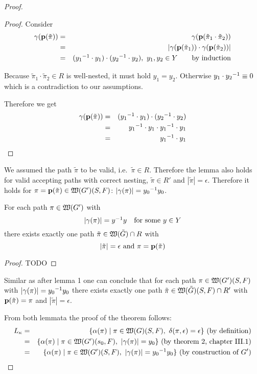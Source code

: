 \begin{proof}
\begin{proof}
Consider 
\begin{eqnarray*}
\gamma(\mathbf{p}({\tilde{\pi}})) &=& \gamma(\mathbf{p}({\tilde{\pi}_1 \cdot \tilde{\pi}_2}))
\\
&=& |\gamma(\mathbf{p}({\tilde{\pi}_1})) \cdot \gamma(\mathbf{p}({\tilde{\pi}_2}))| \\
&=& (\mbox{${y_1}^{-1}$} \cdot y_1) \cdot (\mbox{${y_2}^{-1}$} \cdot y_2),\ y_1, y_2 \in
Y\qquad\text{by induction}
\end{eqnarray*}

Because $\tilde{\pi}_1 \cdot \tilde{\pi}_2 \in R$ is well-nested, it must hold
$y_1 = y_2$. Otherwise $y_1 \cdot \mbox{${y_2}^{-1}$} \equiv 0$ which is a contradiction
to our assumptions.

Therefore we get
\begin{eqnarray*}
\gamma(\mathbf{p}({\tilde{\pi}})) &=& (\mbox{${y_1}^{-1}$} \cdot y_1) \cdot (\mbox{${y_2}^{-1}$} \cdot
y_2)\\
&=& \mbox{${y_1}^{-1}$} \cdot y_1 \cdot \mbox{${y_1}^{-1}$} \cdot y_1 \\
&=& \mbox{${y_1}^{-1}$} \cdot y_1
\end{eqnarray*}
\end{proof}

We assumed the path $\tilde{\pi}$ to be valid, i.e.\ $\tilde{\pi} \in R$.
Therefore the lemma also holds for valid accepting paths with correct nesting,
$\tilde{\pi} \in R'$ and $|\tilde{\pi}| = \epsilon$. Therefore it holds for
$\pi = \mathbf{p}({\tilde{\pi}}) \in \mbox{$\mathfrak{W}({G'})$}(S, F)$: $|\gamma(\pi)| = \mbox{${y_0}^{-1}$}
y_0$.

\bigskip
\begin{lemma}
For each path $\pi \in \mbox{$\mathfrak{W}({G'})$}$ with
\[ |\gamma(\pi)| = \mbox{${y}^{-1}$} y \quad\text{for some }y \in Y \]
there exists exactly one path $\tilde{\pi} \in \mbox{$\mathfrak{W}({\tilde{G}})$} \cap R$ with
\[ |\tilde{\pi}| = \epsilon\text{ and }\pi = \mathbf{p}({\tilde{\pi}}) \] 
\end{lemma}

\begin{proof}
TODO
\end{proof}

Similar as after lemma 1 one can conclude that for each path $\pi \in
\mbox{$\mathfrak{W}({G'})$}(S, F)$ with $|\gamma(\pi)| = \mbox{${y_0}^{-1}$}y_0$ there exists exactly one
path $\tilde{\pi} \in \mbox{$\mathfrak{W}({\tilde{G}})$}(S, F) \cap R'$ with
$\mathbf{p}({\tilde{\pi}}) = \pi$ and $|\tilde{\pi}| = \epsilon$.

From both lemmata the proof of the theorem follows:
\begin{eqnarray*}
L_\kappa &=& \setof{\alpha(\pi) \mid \pi \in \pathcat{G}(S, F),\ \delta(\pi,
\epsilon) = \epsilon}\text{ (by definition)} \\
&=& \setof{\alpha(\pi) \mid \pi \in \pathcat{G'}(s_0, F),\ |\gamma(\pi)| =
y_0}\text{ (by theorem 2, chapter III.1)} \\
&=& \setof{\alpha(\pi) \mid \pi \in \pathcat{G'}(S, F),\
|\gamma(\pi)| = \inv{y_0} y_0}\text{ (by construction of $G'$)}
\end{eqnarray*}


\end{proof}
